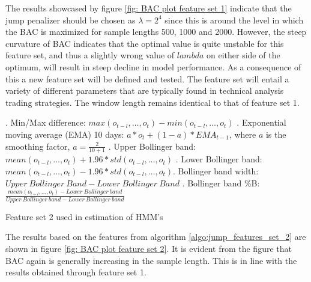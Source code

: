 The results showcased by figure \ref{fig: BAC plot feature set 1} indicate that the jump penalizer should be chosen as $\lambda = 2^4$ since this is around the level in which the BAC is maximized for sample lengths 500, 1000 and 2000. However, the steep curvature of BAC indicates that the optimal value is quite unstable for this feature set, and thus a slightly wrong value of $lambda$ on either side of the optimum, will result in steep decline in model performance. As a consequence of this a new feature set will be defined and tested. The feature set will entail a variety of different parameters that are typically found in technical analysis trading strategies. The window length remains identical to that of feature set 1.

\begin{algorithm}[H]
. Min/Max difference: $max(o_{t-l},\ldots,o_{t}) - min(o_{t-l},\ldots,o_{t})$ . Exponential moving average (EMA) 10 days: $a * o_t + (1-a) * EMA_{t-1}$, \quad where $a$ is the smoothing factor, $a = \frac{2}{10+1}$ . Upper Bollinger band: $mean(o_{t-l},\ldots,o_t) + 1.96 * std(o_{t-l},\ldots,o_t)$ . Lower Bollinger band: $mean(o_{t-l},\ldots,o_t) - 1.96 * std(o_{t-l},\ldots,o_t)$. Bollinger band width: $Upper\ Bollinger\ Band - Lower\  Bollinger\ Band$ . Bollinger band \%B: $\frac{mean(o_{t-l},\ldots,o_{t}) - Lower\ Bollinger\ band} {Upper\ Bollinger\ band - Lower\ Bollinger\ band}$  \;
\BlankLine
{}
\caption{Feature set 2 used in \jump estimation of HMM's}
\label{algo:jump_features_set_2}
\end{algorithm}

The results based on the features from algorithm \ref{algo:jump_features_set_2} are shown in figure \ref{fig: BAC plot feature set 2}. It is evident from the figure that BAC again is generally increasing in the sample length. This is in line with the results obtained through feature set 1.

